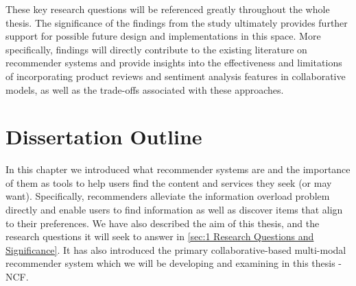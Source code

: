     
These key research questions will be referenced greatly throughout the whole thesis. The significance of the findings from the study ultimately provides further support for possible future design and implementations in this space. More specifically, findings will directly contribute to the existing literature on recommender systems and provide insights into the effectiveness and limitations of incorporating product reviews and sentiment analysis features in collaborative models, as well as the trade-offs associated with these approaches.

\section{Dissertation Outline}
\label{sec:Dissertation Outline}

In this chapter we introduced what recommender systems are and the importance of them as tools to help users find the content and services they seek (or may want). Specifically, recommenders alleviate the information overload problem directly and enable users to find information as well as discover items that align to their preferences. We have also described the aim of this thesis, and the research questions it will seek to answer in \ref{sec:1 Research Questions and Significance}. It has also introduced the primary collaborative-based multi-modal recommender system which we will be developing and examining in this thesis - NCF. 


